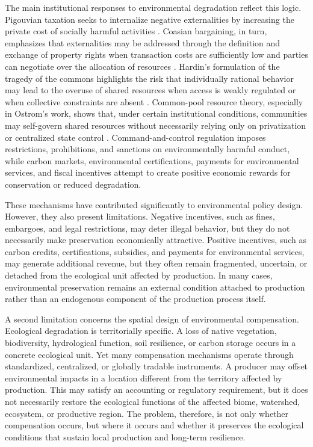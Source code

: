 The main institutional responses to environmental degradation reflect this logic. Pigouvian taxation seeks to internalize negative externalities by increasing the private cost of socially harmful activities \cite{pigou2010liberty}. Coasian bargaining, in turn, emphasizes that externalities may be addressed through the definition and exchange of property rights when transaction costs are sufficiently low and parties can negotiate over the allocation of resources \cite{coase1960social}. Hardin's formulation of the tragedy of the commons highlights the risk that individually rational behavior may lead to the overuse of shared resources when access is weakly regulated or when collective constraints are absent \cite{hardin1968tragedy}. Common-pool resource theory, especially in Ostrom's work, shows that, under certain institutional conditions, communities may self-govern shared resources without necessarily relying only on privatization or centralized state control \cite{ostrom1990commons, ostrom2002commonpool}. Command-and-control regulation imposes restrictions, prohibitions, and sanctions on environmentally harmful conduct, while carbon markets, environmental certifications, payments for environmental services, and fiscal incentives attempt to create positive economic rewards for conservation or reduced degradation.

These mechanisms have contributed significantly to environmental policy design. However, they also present limitations. Negative incentives, such as fines, embargoes, and legal restrictions, may deter illegal behavior, but they do not necessarily make preservation economically attractive. Positive incentives, such as carbon credits, certifications, subsidies, and payments for environmental services, may generate additional revenue, but they often remain fragmented, uncertain, or detached from the ecological unit affected by production. In many cases, environmental preservation remains an external condition attached to production rather than an endogenous component of the production process itself.

A second limitation concerns the spatial design of environmental compensation. Ecological degradation is territorially specific. A loss of native vegetation, biodiversity, hydrological function, soil resilience, or carbon storage occurs in a concrete ecological unit. Yet many compensation mechanisms operate through standardized, centralized, or globally tradable instruments. A producer may offset environmental impacts in a location different from the territory affected by production. This may satisfy an accounting or regulatory requirement, but it does not necessarily restore the ecological functions of the affected biome, watershed, ecosystem, or productive region. The problem, therefore, is not only whether compensation occurs, but where it occurs and whether it preserves the ecological conditions that sustain local production and long-term resilience.

